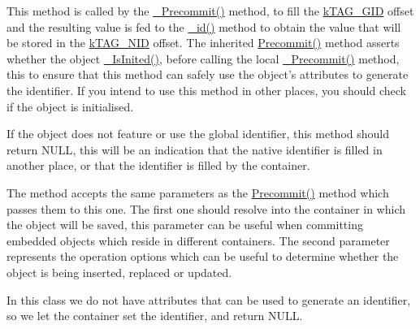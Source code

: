 This method is called by the \hyperlink{class_c_persistent_document_a23cfbb5ebf75e008622ab9e723472c70}{\-\_\-\-Precommit()} method, to fill the \hyperlink{}{k\-T\-A\-G\-\_\-\-G\-I\-D} offset and the resulting value is fed to the \hyperlink{class_c_persistent_object_ace9f531fd290f67d5ef0398b5233d558}{\-\_\-id()} method to obtain the value that will be stored in the \hyperlink{}{k\-T\-A\-G\-\_\-\-N\-I\-D} offset. The inherited \hyperlink{}{Precommit()} method asserts whether the object \hyperlink{class_c_status_document_a954dee06e219e0a0f2e7fa6edac56e28}{\-\_\-\-Is\-Inited()}, before calling the local \hyperlink{class_c_persistent_document_a23cfbb5ebf75e008622ab9e723472c70}{\-\_\-\-Precommit()} method, this to ensure that this method can safely use the object's attributes to generate the identifier. If you intend to use this method in other places, you should check if the object is initialised.

If the object does not feature or use the global identifier, this method should return {\ttfamily N\-U\-L\-L}, this will be an indication that the native identifier is filled in another place, or that the identifier is filled by the container.

The method accepts the same parameters as the \hyperlink{}{Precommit()} method which passes them to this one. The first one should resolve into the container in which the object will be saved, this parameter can be useful when committing embedded objects which reside in different containers. The second parameter represents the operation options which can be useful to determine whether the object is being inserted, replaced or updated.

In this class we do not have attributes that can be used to generate an identifier, so we let the container set the identifier, and return {\ttfamily N\-U\-L\-L}.


